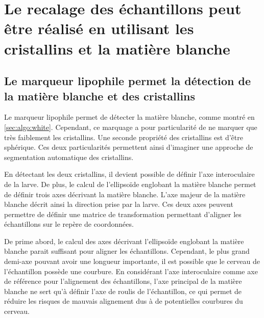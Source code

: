 \documentclass[\main/main.tex]{subfiles}
\begin{document}
\section{\label{sec:algo:recalage}Le recalage des échantillons peut être réalisé en utilisant les cristallins et la matière blanche
}

\subsection{Le marqueur lipophile permet la détection de la matière blanche et des cristallins}

%
Le marqueur lipophile permet de détecter la matière blanche, comme montré en \autoref{sec:algo:white}.
%
Cependant, ce marquage a pour particularité de ne marquer que très faiblement les cristallins.
%
Une seconde propriété des cristallins est d'être sphérique.
%
Ces deux particularités permettent ainsi d'imaginer une approche de segmentation automatique des cristallins.
%

%
En détectant les deux cristallins, il devient possible de définir l'axe interoculaire de la larve.
%
De plus, le calcul de l'ellipsoïde englobant la matière blanche permet de définir trois axes décrivant la matière blanche.
%
L'axe majeur de la matière blanche décrit ainsi la direction prise par la larve.
%
Ces deux axes peuvent permettre de définir une matrice de transformation permettant d'aligner les échantillons sur le repère de coordonnées.

%
De prime abord, le calcul des axes décrivant l'ellipsoïde englobant la matière blanche parait suffisant pour aligner les échantillons.
%
Cependant, le plus grand demi-axe pouvant avoir une longueur importante, il est possible que le cerveau de l'échantillon possède une courbure.
%
En considérant l'axe interoculaire comme axe de référence pour l'alignement des échantillons, l'axe principal de la matière blanche ne sert qu'à définir l'axe de roulis de l'échantillon, ce qui permet de réduire les risques de mauvais alignement dus à de potentielles courbures du cerveau.
\end{document}
